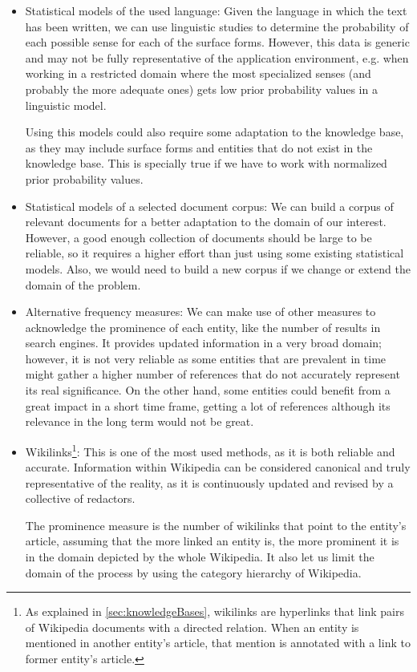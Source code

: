 \begin{itemize}
\item Statistical models of the used language: Given the language in which the text has been written, we can use linguistic studies to determine the probability of each possible sense for each of the surface forms. However, this data is generic and may not be fully representative of the application environment, e.g. when working in a restricted domain where the most specialized senses (and probably the more adequate ones) gets low prior probability values in a linguistic model.

Using this models could also require some adaptation to the knowledge base, as they may include surface forms and entities that do not exist in the knowledge base. This is specially true if we have to work with normalized prior probability values.

\item Statistical models of a selected document corpus: We can build a corpus of relevant documents for a better adaptation to the domain of our interest. However, a good enough collection of documents should be large to be reliable, so it requires a higher effort than just using some existing statistical models. Also, we would need to build a new corpus if we change or extend the domain of the problem.

\item Alternative frequency measures: We can make use of other measures to acknowledge the prominence of each entity, like the number of results in search engines. It provides updated information in a very broad domain; however, it is not very reliable as some entities that are prevalent in time might gather a higher number of references that do not accurately represent its real significance. On the other hand, some entities could benefit from a great impact in a short time frame, getting a lot of references although its relevance in the long term would not be great.

\item Wikilinks\footnote{As explained in \autoref{sec:knowledgeBases}, wikilinks are hyperlinks that link pairs of Wikipedia documents with a directed relation. When an entity is mentioned in another entity's article, that mention is annotated with a link to former entity's article.}: This is one of the most used methods, as it is both reliable and accurate. Information within Wikipedia can be considered canonical and truly representative of the reality, as it is continuously updated and revised by a collective of redactors.

The prominence measure is the number of wikilinks that point to the entity's article, assuming that the more linked an entity is, the more prominent it is in the domain depicted by the whole Wikipedia. It also let us limit the domain of the process by using the category hierarchy of Wikipedia.
\end{itemize}

